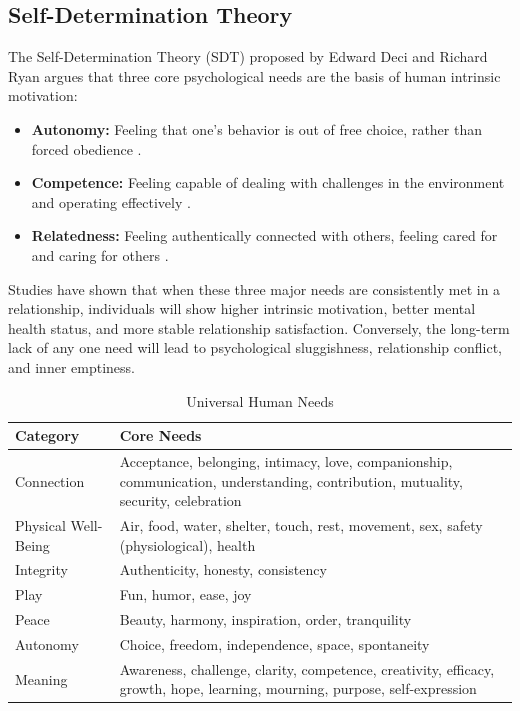 \subsection{Self-Determination Theory}
The Self-Determination Theory (SDT) proposed by Edward Deci and Richard
Ryan argues that three core psychological needs are the basis of human
intrinsic motivation:
\begin{itemize}
    \item \textbf{Autonomy:} Feeling that one's behavior is out of free
    choice, rather than forced obedience \citep{thomas1977}.
    \item \textbf{Competence:} Feeling capable of dealing with challenges
    in the environment and operating effectively \citep{dweck2006}.
    \item \textbf{Relatedness:} Feeling authentically connected with others,
    feeling cared for and caring for others \citep{feldman2024}.
\end{itemize}
Studies have shown that when these three major needs are consistently met
in a relationship, individuals will show higher intrinsic motivation,
better mental health status, and more stable relationship satisfaction.
Conversely, the long-term lack of any one need will lead to psychological
sluggishness, relationship conflict, and inner emptiness.

\begin{table}[h]
\centering
\caption{Universal Human Needs}
\label{tab:universal_needs}
\begin{tabular}{|l|p{11cm}|}
\hline
\textbf{Category} & \textbf{Core Needs} \\ \hline
Connection & Acceptance, belonging, intimacy, love, companionship, communication, understanding, contribution, mutuality, security, celebration \\ \hline
Physical Well-Being & Air, food, water, shelter, touch, rest, movement, sex, safety (physiological), health \\ \hline
Integrity & Authenticity, honesty, consistency \\ \hline
Play & Fun, humor, ease, joy \\ \hline
Peace & Beauty, harmony, inspiration, order, tranquility \\ \hline
Autonomy & Choice, freedom, independence, space, spontaneity \\ \hline
Meaning & Awareness, challenge, clarity, competence, creativity, efficacy, growth, hope, learning, mourning, purpose, self-expression \\ \hline
\end{tabular}
\end{table}

